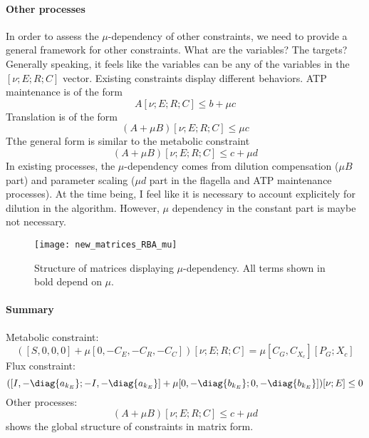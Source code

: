 \paragraph{Other processes} 
In order to assess the $\mu$-dependency of other constraints, we need to provide a general framework for other constraints. What are the variables? The targets? Generally speaking, it feels like the variables can be any of the variables in the $[\nu; E; R; C]$ vector. Existing constraints display different behaviors. ATP maintenance is of the form
\[
A [\nu; E; R; C] \leq b + \mu c
\]
Translation is of the form
\[
(A+\mu B) [\nu;E;R;C] \leq \mu c
\]
Tthe general form is similar to the metabolic constraint
\[
(A+\mu B) [\nu;E;R;C] \leq c + \mu d
\]
In existing processes, the $\mu$-dependency comes from dilution compensation ($\mu B$ part) and parameter scaling ($\mu d$ part in the flagella and ATP maintenance processes). At the time being, I feel like it is necessary to account explicitely for dilution in the algorithm. However, $\mu$ dependency in the constant part is maybe not necessary.

\begin{figure}[ht]
  \centering
  \texttt{[image: new\_matrices\_RBA\_mu]}
  \caption{Structure of matrices displaying $\mu$-dependency. All terms shown in bold depend on $\mu$.}
  \label{fig:new_matrices_rba_mu}
\end{figure}

\paragraph{Summary} 
Metabolic constraint:
\[
([S, 0,0,0] + \mu [0, -C_E,-C_R,-C_C])[\nu;E;R;C] = \mu [C_G,C_{X_c}] [P_G;X_c]
\]
Flux constraint:
\[
([I,-\diag{a_{k_E}};-I,-\diag{a_{k_E}}]
+ \mu [0,-\diag{b_{k_E}};0,-\diag{b_{k_E}}])
[\nu; E] \leq 0
\]
Other processes:
\[
(A+\mu B) [\nu;E;R;C] \leq c + \mu d
\]
 shows the global structure of constraints in matrix form.


